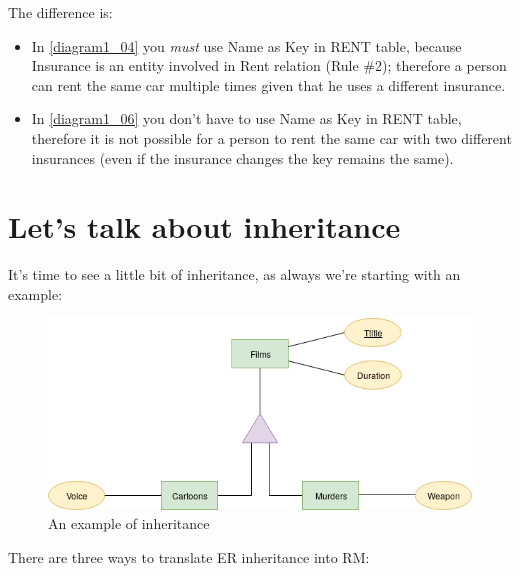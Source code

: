 \documentclass[class=book, crop=false, oneside]{standalone}
\begin{document}
The difference is:
\begin{itemize}
	\item In \ref{diagram1_04} you \emph{must} use Name as Key in RENT table, because Insurance is an entity involved in Rent relation (Rule \#2); therefore a person can rent the same car multiple times given that he uses a different insurance.\\
	\item In \ref{diagram1_06} you don't have to use Name as Key in RENT table, therefore it is not possible for a person to rent the same car with two different insurances (even if the insurance changes the key remains the same).
\end{itemize}

\section{Let's talk about inheritance}
It's time to see a little bit of inheritance, as always we're starting with an example:
\begin{figure}[H]
	\includegraphics[width=\textwidth,keepaspectratio]{diagram2_00.png}
	\caption{An example of inheritance}
	\label{diagram2_00}
\end{figure}
There are three ways to translate ER inheritance into RM:
\end{document}
